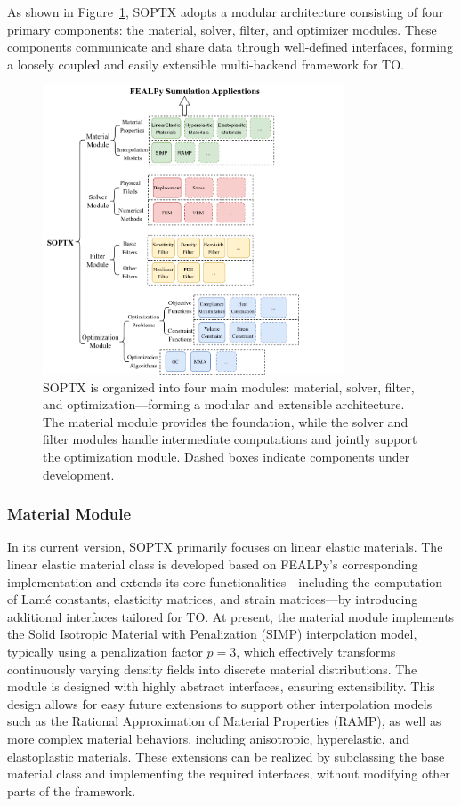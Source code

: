 \documentclass[mathpazo]{cicp}
\begin{document}
As shown in Figure~\ref{fs:fig2}, SOPTX adopts a modular architecture consisting of four primary components: the material, solver, filter, and optimizer modules. These components communicate and share data through well-defined interfaces, forming a loosely coupled and easily extensible multi-backend framework for TO.
\begin{figure}[htp]
	\centering
	\includegraphics[width=0.8\textwidth]{figures/soptx_structure.png}
	\caption{SOPTX is organized into four main modules: material, solver, filter, and optimization—forming a modular and extensible architecture. The material module provides the foundation, while the solver and filter modules handle intermediate computations and jointly support the optimization module. Dashed boxes indicate components under development.}
	\label{fs:fig2}
\end{figure}

\subsubsection{Material Module}
In its current version, SOPTX primarily focuses on linear elastic materials. The linear elastic material class is developed based on FEALPy’s corresponding implementation and extends its core functionalities---including the computation of Lamé constants, elasticity matrices, and strain matrices---by introducing additional interfaces tailored for TO. At present, the material module implements the Solid Isotropic Material with Penalization (SIMP) interpolation model, typically using a penalization factor $p = 3$, which effectively transforms continuously varying density fields into discrete material distributions. The module is designed with highly abstract interfaces, ensuring extensibility. This design allows for easy future extensions to support other interpolation models such as the Rational Approximation of Material Properties (RAMP), as well as more complex material behaviors, including anisotropic, hyperelastic, and elastoplastic materials. These extensions can be realized by subclassing the base material class and implementing the required interfaces, without modifying other parts of the framework.
\end{document}
